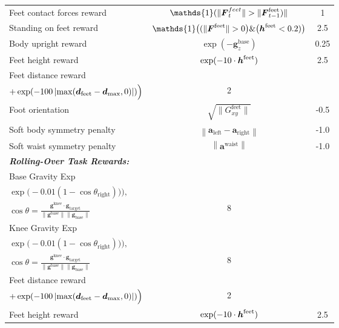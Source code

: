 \begin{table}[ht!]
{\begin{tabular}{l c c}
Feet contact forces reward & $\mathds{1} (\lVert \bF_{t}^{feet} \rVert > \lVert \bF^{\text{feet}}_{t-1}) \rVert$ & 1 \\
Standing on feet reward & $\mathds{1} \big((\lVert \bF^{\text{feet}} \rVert > 0\big)\& \big(\bh^{\text{feet}} < 0.2)\big)$ & 2.5 \\
Body upright reward & $\exp(-\mathbf{g}^{\text{base}}_z)$ & 0.25 \\
Feet height reward & $\exp (-10 \cdot \boldsymbol{h}^{\text{feet}}) $ & 2.5 \\
Feet distance reward & \makecell{
$\frac{1}{2} \Big( \exp(-100 \left| \max(\bs{d}_{\text{feet}} - \bs{d}_{\min}, -0.5) \right|)$ \\ 
$+ \exp(-100 \left| \max(\boldsymbol{d}_{\text{feet}} - \boldsymbol{d}_{\max}, 0) \right|) \Big)$
} & 2 \\
Foot orientation & $ \sqrt{\lVert G_{xy}^{\text{feet}} \rVert} $ & -0.5 \\ 
Soft body symmetry penalty & $ \left\| \mathbf{a}_{\text{left}} - \mathbf{a}_{\text{right}} \right\| $ & -1.0 \\  
Soft waist symmetry penalty & $ \left\| \mathbf{a}^{\text{waist}}\right\| $ & -1.0 \\

\midrule[0.6pt]
\multicolumn{3}{l}{\textit{\textbf{Rolling-Over Task Rewards:}}} \\
\midrule[0.6pt]
Base Gravity Exp & \makecell{
$ \frac{1}{2} \Big( \exp \big( -0.01 (1 - \cos \theta_{\text{left}}) \big) +$ \\ 
$\exp \big( -0.01 (1 - \cos \theta_{\text{right}}) \big) \Big),$ \\ 
$\cos \theta = \frac{\mathbf{g}^{\text{knee}} \cdot \mathbf{g}_{\text{target}}}{\|\mathbf{g}^{\text{base}}\| \|\mathbf{g}_{\text{base}}\|}$
} & 8 \\
Knee Gravity Exp & \makecell{
$ \frac{1}{2} \Big( \exp \big( -0.01 (1 - \cos \theta_{\text{left}}) \big) +$ \\ 
$\exp \big( -0.01 (1 - \cos \theta_{\text{right}}) \big) \Big),$ \\ 
$\cos \theta = \frac{\mathbf{g}^{\text{knee}} \cdot \mathbf{g}_{\text{target}}}{\|\mathbf{g}^{\text{base}}\| \|\mathbf{g}_{\text{base}}\|}$
} & 8 \\
Feet distance reward & \makecell{
$\frac{1}{2} \Big( \exp(-100 \left| \max(\bs{d}_{\text{feet}} - \bs{d}_{\min}, -0.5) \right|)$ \\ 
$+ \exp(-100 \left| \max(\boldsymbol{d}_{\text{feet}} - \boldsymbol{d}_{\max}, 0) \right|) \Big)$
} & 2 \\
Feet height reward & $\exp (-10 \cdot \boldsymbol{h}^{\text{feet}}) $ & 2.5 \\
\bottomrule[0.95pt] 
\end{tabular}
}
\end{table}
